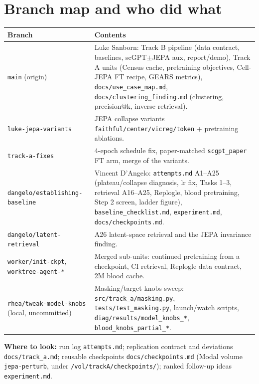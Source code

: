 \documentclass[11pt]{article}
\newcommand{\code}[1]{\texttt{\small #1}}
\begin{document}
\section{Branch map and who did what}
\begin{center}\small
\begin{tabularx}{\linewidth}{>{\raggedright\arraybackslash}p{4.6cm}X}
\toprule
Branch & Contents\\
\midrule
\code{main} (origin) & Luke Sanborn: Track B pipeline (data contract, baselines, scGPT$\pm$JEPA aux, report/demo), Track A units (Census cache, pretraining objectives, Cell-JEPA FT recipe, GEARS metrics), \code{docs/use\_case\_map.md}, \code{docs/clustering\_finding.md} (clustering, precision@k, inverse retrieval).\\
\code{luke-jepa-variants} & JEPA collapse variants \code{faithful/center/vicreg/token} + pretraining ablations.\\
\code{track-a-fixes} & 4-epoch schedule fix, paper-matched \code{scgpt\_paper} FT arm, merge of the variants.\\
\code{dangelo/establishing-baseline} & Vincent D'Angelo: \code{attempts.md} A1--A25 (plateau/collapse diagnosis, lr fix, Tasks 1--3, retrieval A16--A25, Replogle, blood pretraining, Step 2 screen, ladder figure), \code{baseline\_checklist.md}, \code{experiment.md}, \code{docs/checkpoints.md}.\\
\code{dangelo/latent-retrieval} & A26 latent-space retrieval and the JEPA invariance finding.\\
\code{worker/init-ckpt}, \code{worktree-agent-*} & Merged sub-units: continued pretraining from a checkpoint, CI retrieval, Replogle data contract, 2M blood cache.\\
\code{rhea/tweak-model-knobs} (local, uncommitted) & Masking/target knobs sweep: \code{src/track\_a/masking.py}, \code{tests/test\_masking.py}, launch/watch scripts, \code{diag/results/model\_knobs\_*}, \code{blood\_knobs\_partial\_*}.\\
\bottomrule
\end{tabularx}
\end{center}
\textbf{Where to look:} run log \code{attempts.md}; replication contract and deviations \code{docs/track\_a.md}; reusable checkpoints \code{docs/checkpoints.md} (Modal volume \code{jepa-perturb}, under \code{/vol/trackA/checkpoints/}); ranked follow-up ideas \code{experiment.md}.
\end{document}
